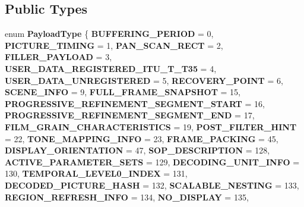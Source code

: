 \subsection*{Public Types}
\begin{DoxyCompactItemize}
\item 
\mbox{\label{class_s_e_i_a35db73eef49d1f8545e6a062d16903a7}} 
enum {\bfseries Payload\+Type} \{ \newline
{\bfseries B\+U\+F\+F\+E\+R\+I\+N\+G\+\_\+\+P\+E\+R\+I\+OD} = 0, 
{\bfseries P\+I\+C\+T\+U\+R\+E\+\_\+\+T\+I\+M\+I\+NG} = 1, 
{\bfseries P\+A\+N\+\_\+\+S\+C\+A\+N\+\_\+\+R\+E\+CT} = 2, 
{\bfseries F\+I\+L\+L\+E\+R\+\_\+\+P\+A\+Y\+L\+O\+AD} = 3, 
\newline
{\bfseries U\+S\+E\+R\+\_\+\+D\+A\+T\+A\+\_\+\+R\+E\+G\+I\+S\+T\+E\+R\+E\+D\+\_\+\+I\+T\+U\+\_\+\+T\+\_\+\+T35} = 4, 
{\bfseries U\+S\+E\+R\+\_\+\+D\+A\+T\+A\+\_\+\+U\+N\+R\+E\+G\+I\+S\+T\+E\+R\+ED} = 5, 
{\bfseries R\+E\+C\+O\+V\+E\+R\+Y\+\_\+\+P\+O\+I\+NT} = 6, 
{\bfseries S\+C\+E\+N\+E\+\_\+\+I\+N\+FO} = 9, 
\newline
{\bfseries F\+U\+L\+L\+\_\+\+F\+R\+A\+M\+E\+\_\+\+S\+N\+A\+P\+S\+H\+OT} = 15, 
{\bfseries P\+R\+O\+G\+R\+E\+S\+S\+I\+V\+E\+\_\+\+R\+E\+F\+I\+N\+E\+M\+E\+N\+T\+\_\+\+S\+E\+G\+M\+E\+N\+T\+\_\+\+S\+T\+A\+RT} = 16, 
{\bfseries P\+R\+O\+G\+R\+E\+S\+S\+I\+V\+E\+\_\+\+R\+E\+F\+I\+N\+E\+M\+E\+N\+T\+\_\+\+S\+E\+G\+M\+E\+N\+T\+\_\+\+E\+ND} = 17, 
{\bfseries F\+I\+L\+M\+\_\+\+G\+R\+A\+I\+N\+\_\+\+C\+H\+A\+R\+A\+C\+T\+E\+R\+I\+S\+T\+I\+CS} = 19, 
\newline
{\bfseries P\+O\+S\+T\+\_\+\+F\+I\+L\+T\+E\+R\+\_\+\+H\+I\+NT} = 22, 
{\bfseries T\+O\+N\+E\+\_\+\+M\+A\+P\+P\+I\+N\+G\+\_\+\+I\+N\+FO} = 23, 
{\bfseries F\+R\+A\+M\+E\+\_\+\+P\+A\+C\+K\+I\+NG} = 45, 
{\bfseries D\+I\+S\+P\+L\+A\+Y\+\_\+\+O\+R\+I\+E\+N\+T\+A\+T\+I\+ON} = 47, 
\newline
{\bfseries S\+O\+P\+\_\+\+D\+E\+S\+C\+R\+I\+P\+T\+I\+ON} = 128, 
{\bfseries A\+C\+T\+I\+V\+E\+\_\+\+P\+A\+R\+A\+M\+E\+T\+E\+R\+\_\+\+S\+E\+TS} = 129, 
{\bfseries D\+E\+C\+O\+D\+I\+N\+G\+\_\+\+U\+N\+I\+T\+\_\+\+I\+N\+FO} = 130, 
{\bfseries T\+E\+M\+P\+O\+R\+A\+L\+\_\+\+L\+E\+V\+E\+L0\+\_\+\+I\+N\+D\+EX} = 131, 
\newline
{\bfseries D\+E\+C\+O\+D\+E\+D\+\_\+\+P\+I\+C\+T\+U\+R\+E\+\_\+\+H\+A\+SH} = 132, 
{\bfseries S\+C\+A\+L\+A\+B\+L\+E\+\_\+\+N\+E\+S\+T\+I\+NG} = 133, 
{\bfseries R\+E\+G\+I\+O\+N\+\_\+\+R\+E\+F\+R\+E\+S\+H\+\_\+\+I\+N\+FO} = 134, 
{\bfseries N\+O\+\_\+\+D\+I\+S\+P\+L\+AY} = 135, 

\end{DoxyCompactItemize}
